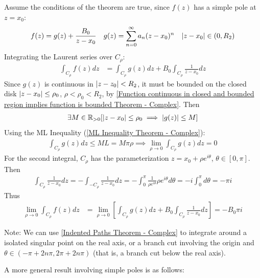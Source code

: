 \documentclass[12pt, english]{book}
\makeatletter
\renewenvironment{proof}[1][\proofname]{\par
	\pushQED{\qed}%
	\normalfont \topsep6\p@\@plus6\p@\relax
	\list{}{%
		\settowidth{\leftmargin}{\itshape\proofname:\hskip\labelsep}%
		\setlength{\labelwidth}{0pt}%
		\setlength{\itemindent}{-\leftmargin}%
	}%
	\item[\hskip\labelsep\itshape#1\@addpunct{:}]\ignorespaces
	}{ \popQED\endlist\@endpefalse}
\makeatother
\begin{document}
	\begin{proof}
		Assume the conditions of the theorem are true, since \(f(z)\) has a simple pole at \(z = x_0\):
		\begin{align*}
			f(z) &= g(z) + \frac{B_0}{z-x_0} & g(z) &= \sum_{n=0}^{\infty} a_n (z-x_0)^n
				& \abs{z-x_0} \in (0, R_2)
		\end{align*}
		Integrating the Laurent series over \(C_\rho\):
		\begin{align*}
			\int_{C_\rho} f(z) dz
			&= \int_{C_\rho} g(z) dz +  B_0 \int_{C_\rho} \frac{1}{z-x_0} dz 
		\end{align*}
		Since \(g(z)\) is continuous in \(\abs{z-z_0} < R_2\), it must be bounded on the closed disk \(\abs{z-x_0} \leq \rho_0\), \(\rho < \rho_0 < R_2\), by \cref{Function continuous in closed and bounded region implies function is bounded Theorem - Complex}. Then
		\begin{align*}
			\exists M \in \mathbb{R}_{>0} [\abs{z-x_0} \leq \rho_0 \implies \abs{g(z)} \leq M]
		\end{align*}
		Using the ML Inequality (\cref{ML Inequality Theorem - Complex}):
		\begin{align*}
			\int_{C_\rho} g(z) dz \leq ML = M\pi \rho
			\implies \lim_{\rho \rightarrow 0} \int_{C_\rho} g(z) dz = 0
		\end{align*}
		For the second integral, \(C_\rho\) has the parameterization \(z = x_0 + \rho e^{i\theta}\), \(\theta \in [0, \pi]\). Then
		\begin{align*}
			\int_{C_\rho} \frac{1}{z-x_0} dz 
			= - \int_{-C_\rho} \frac{1}{z-x_0} dz 
			= - \int_{0}^{\pi} \frac{1}{\rho e^{i\theta}} \rho e^{i\theta} d\theta 
			= -i \int_{0}^{\pi} d\theta = -\pi i
		\end{align*}
		Thus
		\begin{align*}
			\lim_{\rho \rightarrow 0} \int_{C_\rho} f(z) dz
			&= \lim_{\rho \rightarrow 0} \left[ \int_{C_\rho} g(z) dz + B_0 \int_{C_\rho} \frac{1}{z-x_0} dz \right] 
			 = - B_0 \pi i
		\end{align*}
	\end{proof}

	Note: We can use \cref{Indented Paths Theorem - Complex} to integrate around a isolated singular point on the real axis, or a branch cut involving the origin and \(\theta \in (-\pi + 2n\pi, 2\pi + 2n\pi)\) (that is, a branch cut below the real axis).

	A more general result involving simple poles is as follows:
	
\end{document}
